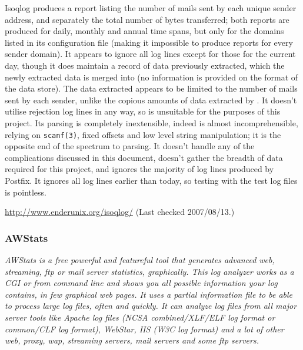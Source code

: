 Isoqlog produces a report listing the number of mails sent by each unique
sender address, and separately the total number of bytes transferred; both
reports are produced for daily, monthly and annual time spans, but only for
the domains listed in its configuration file (making it impossible to
produce reports for every sender domain).  It appears to ignore all log
lines except for those for the current day, though it does maintain a
record of data previously extracted, which the newly extracted data is
merged into (no information is provided on the format of the data store).
The data extracted appears to be limited to the number of mails sent by
each sender, unlike the copious amounts of data extracted by \parsername{}.
It doesn't utilise rejection log lines in any way, so is unsuitable for the
purposes of this project.  Its parsing is completely inextensible, indeed
is almost incomprehensible, relying on \texttt{scanf(3)}, fixed offsets and
low level string manipulation; it is the opposite end of the spectrum to
\parsernames{} parsing.  It doesn't handle any of the complications
discussed in this document, doesn't gather the breadth of data required for
this project, and ignores the majority of log lines produced by Postfix.
It ignores all log lines earlier than today, so testing with the test log
files is pointless.

\url{http://www.enderunix.org/isoqlog/} \newline (Last checked 2007/08/13.)

\subsubsection{AWStats}

\textit{AWStats is a free powerful and featureful tool that generates
advanced web, streaming, ftp or mail server statistics, graphically. This
log analyzer works as a CGI or from command line and shows you all possible
information your log contains, in few graphical web pages. It uses a
partial information file to be able to process large log files, often and
quickly. It can analyze log files from all major server tools like Apache
log files (NCSA combined/XLF/ELF log format or common/CLF log format),
WebStar, IIS (W3C log format) and a lot of other web, proxy, wap, streaming
servers, mail servers and some ftp servers.\/}

